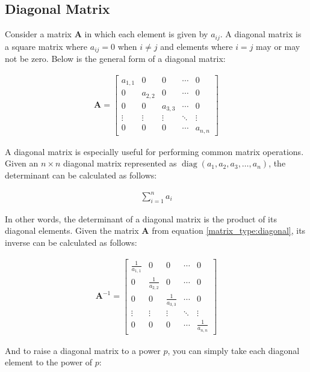 \documentclass[12pt]{book}
\begin{document}
	\subsection{Diagonal Matrix}
	Consider a matrix $\bm{A}$ in which each element is given by $a_{ij}$. A diagonal matrix is a square matrix where $a_{ij} = 0$ when $i \ne j$ and elements where $i = j$ may or may not be zero. Below is the general form of a diagonal matrix:
	
	\begin{align}
		\bm{A} = \begin{bmatrix}
			a_{1,1} & 0 & 0 & \cdots & 0 \\
			0 & a_{2,2} & 0 & \cdots & 0 \\
			0 & 0 & a_{3,3} & \cdots & 0 \\
			\vdots & \vdots & \vdots & \ddots & \vdots \\
			0 & 0 & 0 & \cdots & a_{n,n}
		\end{bmatrix}
		\label{matrix_type:diagonal}
	\end{align}
	
	A diagonal matrix is especially useful for performing common matrix operations. Given an $n \times n$ diagonal matrix represented as $\operatorname{diag}(a_1, a_2, a_3, \ldots, a_n)$, the determinant can be calculated as follows:
	
	\begin{align}
		\sum_{i=1}^n a_i
	\end{align}
	
	In other words, the determinant of a diagonal matrix is the product of its diagonal elements. Given the matrix $\bm{A}$ from equation \ref{matrix_type:diagonal}, its inverse can be calculated as follows: 
	
	\begin{align}
		\bm{A}^{-1} = \begin{bmatrix}
			\frac{1}{a_{1,1}} & 0 & 0 & \cdots & 0 \\
			0 & \frac{1}{a_{2,2}} & 0 & \cdots & 0 \\
			0 & 0 & \frac{1}{a_{3,3}} & \cdots & 0 \\
			\vdots & \vdots & \vdots & \ddots & \vdots \\
			0 & 0 & 0 & \cdots & \frac{1}{a_{n,n}}
		\end{bmatrix}
	\end{align}
	
	And to raise a diagonal matrix to a power $p$, you can simply take each diagonal element to the power of $p$:
	
\end{document}
